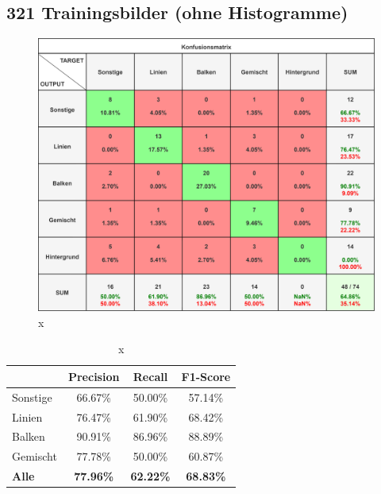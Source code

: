 \subsection*{321 Trainingsbilder (ohne Histogramme)}

\begin{figure}[H]
    \centering
    \captionsetup{width=1\linewidth}
    \includegraphics[width=1\textwidth]{Experimente/img/detect/3_val@0.653_nohisto/konfusionsmatrix.png}
    \caption{ x}
    \label{fig:extraction_output}
\end{figure}

\begin{table}[H]
    \centering
    \begin{tabular}{|l|c|c|c|}
        \hline
        \rowcolor[HTML]{EFEFEF}
                      & Precision        & Recall           & F1-Score         \\ \hline
        Sonstige      & 66.67\%          & 50.00\%          & 57.14\%          \\ \hline
        Linien        & 76.47\%          & 61.90\%          & 68.42\%          \\ \hline
        Balken        & 90.91\%          & 86.96\%          & 88.89\%          \\ \hline
        Gemischt      & 77.78\%          & 50.00\%          & 60.87\%          \\ \hline
        \textbf{Alle} & \textbf{77.96\%} & \textbf{62.22\%} & \textbf{68.83\%} \\ \hline
    \end{tabular}
    \caption{x}
\end{table}


